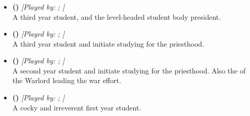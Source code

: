 \documentclass[blue]{GL2020}
\begin{document}
\subsubsection*{\pShip{}}
\begin{itemize}
	\item \textbf{\cPresident{\full} (\cPresident{\MYCharpronouns})} \textit{[Played by: \cPresident{\MYplayer}; \cPresident{\MYPlaypronouns}]}\\ A third year student, and the level-headed student body president.

	\item \textbf{\cInitiate{\full} (\cInitiate{\MYCharpronouns})} \textit{[Played by: \cInitiate{\MYplayer}; \cInitiate{\MYPlaypronouns}]}\\ A third year student and initiate studying for the priesthood.
		
	\item \textbf{\cWarlordDaughter{\full} (\cWarlordDaughter{\MYCharpronouns})} \textit{[Played by: \cWarlordDaughter{\MYplayer}; \cWarlordDaughter{\MYPlaypronouns}]}\\ A second year student and initiate studying for the priesthood. Also the \cWarlordDaughter{\child} of the Warlord leading the \pShip{} war effort.
			
	\item \textbf{\cPirateChild{\full} (\cPirateChild{\MYCharpronouns})} \textit{[Played by: \cPirateChild{\MYplayer}; \cPirateChild{\MYPlaypronouns}]}\\ A cocky and irreverent first year student.
		
\end{itemize}
\end{document}
